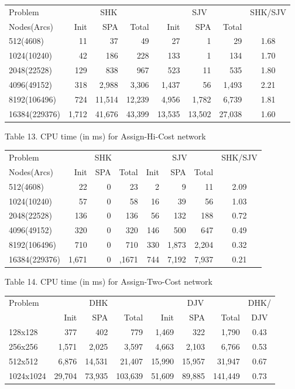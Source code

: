 \vskip 5pt
{\small
\begin{tabular}{|l|rrr|rrr|c|} \hline
 Problem & \multicolumn{3}{c|}{SHK}& \multicolumn{3}{c|}{SJV}&\multicolumn{1}{c|}{SHK/SJV}\\
Nodes(Arcs)&Init &SPA &Total &Init &SPA &Total&\\ \hline
512(4608)& 11& 37& 49&           27& 1& 29& 1.68\\ 
1024(10240)& 42& 186& 228&       133& 1& 134& 1.70\\ 
2048(22528)& 129& 838& 967&      523& 11& 535& 1.80\\ 
4096(49152)& 318& 2,988& 3,306&   1,437& 56& 1,493& 2.21\\ 
8192(106496)& 724& 11,514& 12,239& 4,956& 1,782& 6,739& 1.81\\ 
16384(229376)& 1,712& 41,676& 43,399& 13,535& 13,502& 27,038& 1.60\\ 
\hline
\end{tabular}
}

\vskip 2pt
{Table 13. CPU time (in ms) for Assign-Hi-Cost network}
\vskip 5pt

\vskip 5pt
{\small
\begin{tabular}{|l|rrr|rrr|c|} \hline
 Problem & \multicolumn{3}{c|}{SHK}& \multicolumn{3}{c|}{SJV}&\multicolumn{1}{c|}{SHK/SJV}\\
Nodes(Arcs)&Init &SPA &Total &Init &SPA &Total&\\ \hline
512(4608)& 22& 0& 23&         2& 9& 11& 2.09\\ 
1024(10240)& 57& 0& 58&       16& 39& 56& 1.03\\ 
2048(22528)& 136& 0& 136&     56& 132& 188& 0.72\\ 
4096(49152)& 320& 0& 320&     146& 500& 647& 0.49\\ 
8192(106496)& 710& 0& 710&     330& 1,873& 2,204& 0.32\\ 
16384(229376)& 1,671& 0& ,1671& 744& 7,192& 7,937& 0.21\\ \hline
\end{tabular}
}

\vskip 2pt
{Table 14. CPU time (in ms) for Assign-Two-Cost network}
\vskip 5pt

\vskip 5pt
{\small
\begin{tabular}{|l|rrr|rrr|c|} \hline
 Problem & \multicolumn{3}{c|}{DHK}& \multicolumn{3}{c|}{DJV}&{DHK/}\\
&Init &SPA &Total &Init &SPA &Total& DJV\\ \hline
128x128&  377& 402& 779&             1,469& 322& 1,790& 0.43\\ 
256x256&  1,571& 2,025& 3,597&       4,663& 2,103& 6,766& 0.53\\ 
512x512&  6,876& 14,531& 21,407&      15,990& 15,957& 31,947& 0.67\\ 
1024x1024&  29,704& 73,935& 103,639&  51,609& 89,885& 141,449& 0.73\\ 
\hline
\end{tabular}
}

